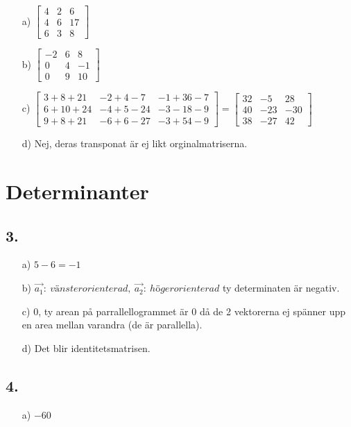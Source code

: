 \documentclass{article}
\begin{document}
\begin{itemize}
	\item[a) ] 	$\begin{bmatrix} 
				4&2 &6 \\
				4&6 &17\\
				6&3 &8
				\end{bmatrix}$
	\item[b) ] $\begin{bmatrix} 
				-2&6 &8 \\
				0&4 &-1\\
				0&9 &10
				\end{bmatrix}$
	\item[c) ] $\begin{bmatrix} 
				3+8+21 &-2+4-7 &-1+36-7\\
				6+10+24 &-4+5-24 &-3-18-9\\
				9+8+21 &-6+6-27 &-3+54-9
				\end{bmatrix}
				=\begin{bmatrix} 
				32 &-5 &28\\
				40 &-23 &-30\\
				38 &-27 &42
				\end{bmatrix}$
	\item[d) ] Nej, deras transponat är ej likt orginalmatriserna.
\end{itemize}

\section*{Determinanter}
\subsection*{3.}
\begin{itemize}
	\item[a) ] $5-6=-1$
	\item[b) ] $\vec{a_1}:\ vänsterorienterad,\ \vec{a_2}:\ högerorienterad$ ty determinaten är negativ.
	\item[c) ] 0, ty arean på parrallellogrammet är 0 då de 2 vektorerna ej spänner upp en area mellan varandra (de är parallella).
	\item[d) ] Det blir identitetsmatrisen.
\end{itemize}

\subsection*{4.}
\begin{itemize}
	\item[a) ]  $-60$
\end{itemize}
\end{document}
